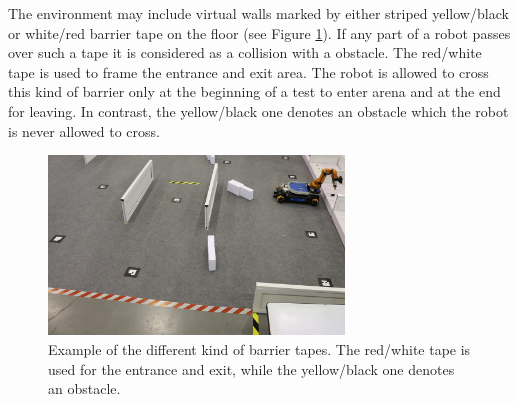 %
	
\begin{envSpec}
The environment may include virtual walls marked by either striped yellow/black or white/red barrier tape on the floor (see Figure \ref{fig:barrier_tape}). If any part of a robot passes over such a tape it is considered as a collision with a obstacle. The red/white tape is used to frame the entrance and exit area. The robot is allowed to cross this kind of barrier only at the beginning of a test to enter arena and at the end for leaving. In contrast, the yellow/black one denotes an obstacle which the robot is never allowed to cross.
\end{envSpec}

\begin{figure} [h!]
	\centering
	\includegraphics[width= 0.7\textwidth ]{pics/atwork/barrier_tape/barrier_tapes_in_china15.jpg}
	\caption{Example of the different kind of barrier tapes. The red/white tape is used for the entrance and exit, while the yellow/black one denotes an obstacle.}
	\label{fig:barrier_tape}
\end{figure}

%
%

